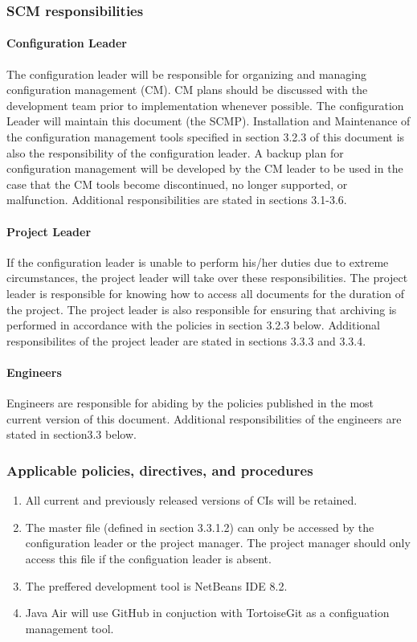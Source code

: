 \documentclass{scrartcl}
\begin{document}
\subsubsection{SCM responsibilities}
\paragraph{Configuration Leader}
The configuration leader will be responsible for organizing and managing configuration management (CM).  CM plans should be discussed with the development team prior to implementation whenever possible.  The configuration Leader will maintain this document (the SCMP).  Installation and Maintenance of the configuration management tools specified in section 3.2.3 of this document is also the responsibility of the configuration leader.  A backup plan for configuration management will be developed by the CM leader to be used in the case that the CM tools become discontinued, no longer supported, or malfunction.
Additional responsibilities are stated in sections 3.1-3.6.
\paragraph{Project Leader}
If the configuration leader is unable to perform his/her duties due to extreme circumstances, the project leader will take over these responsibilities.  The project leader is responsible for knowing how to access all documents for the duration of the project.  The project leader is also responsible for ensuring that archiving is performed in accordance with the policies in section 3.2.3 below.  Additional responsibilites of the project leader are stated in sections 3.3.3 and 3.3.4.
\paragraph{Engineers}
Engineers are responsible for abiding by the policies published in the most current version of this document.  Additional responsibilities of the engineers are stated in section3.3 below.
\subsubsection{Applicable policies, directives, and procedures}
\begin{enumerate}
\item
All current and previously released versions of CIs will be retained.
\item
The master file (defined in section 3.3.1.2) can only be accessed by the configuration leader or the project manager.  The project manager should only access this file if the configuation leader is absent.
\item
The preffered development tool is NetBeans IDE 8.2.
\item
Java Air will use GitHub in conjuction with TortoiseGit as a configuation management tool.
\end{enumerate}
\end{document}
